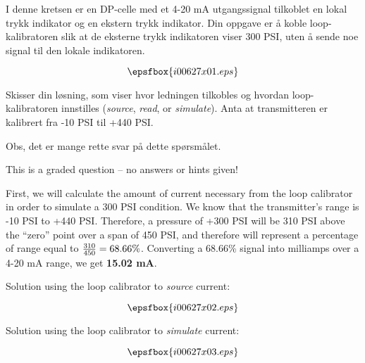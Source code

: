 

I denne kretsen er en DP-celle med et 4-20 mA utgangssignal tilkoblet en lokal trykk indikator og en ekstern trykk indikator. Din oppgave er {\aa} koble loop-kalibratoren slik at de eksterne trykk indikatoren viser 300 PSI, uten {\aa} sende noe signal til den lokale indikatoren. 

$$\epsfbox{i00627x01.eps}$$

Skisser din l{\o}sning, som viser hvor ledningen tilkobles og hvordan loop-kalibratoren innstilles ({\it source}, {\it read}, or {\it simulate}). Anta at transmitteren er kalibrert fra -10 PSI til +440 PSI.  


\vfil

Obs, det er mange rette svar p{\aa} dette sp{\o}rsm{\aa}let. 

\eject






This is a graded question -- no answers or hints given!







First, we will calculate the amount of current necessary from the loop calibrator in order to simulate a 300 PSI condition.  We know that the transmitter's range is -10 PSI to +440 PSI.  Therefore, a pressure of +300 PSI will be 310 PSI above the ``zero'' point over a span of 450 PSI, and therefore will represent a percentage of range equal to ${310 \over 450} = 68.66\%$.  Converting a 68.66\% signal into milliamps over a 4-20 mA range, we get {\bf 15.02 mA}.

\vskip 10pt

Solution using the loop calibrator to {\it source} current:

$$\epsfbox{i00627x02.eps}$$

\vfil \eject

Solution using the loop calibrator to {\it simulate} current:

$$\epsfbox{i00627x03.eps}$$




